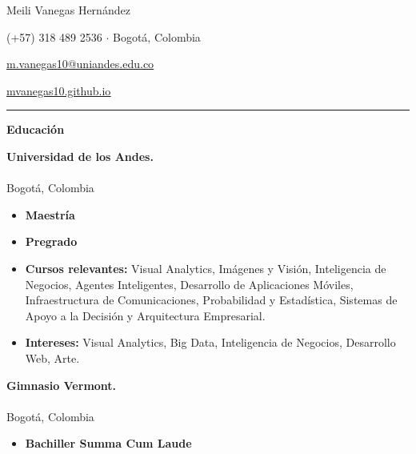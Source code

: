 \documentclass[10pt]{article}
\begin{document}
\begin{center}
\LARGE{Meili Vanegas Hernández} 

\normalsize{
 (+57) 318 489 2536 $\cdot$ Bogotá, Colombia
 
 \href{mailto:m.vanegas10@uniandes.edu.co}{\underline{m.vanegas10@uniandes.edu.co}}
 
\textcolor{blue}{\href{https://mvanegas10.github.io}{\underline{mvanegas10.github.io}}}
}
\end{center}
\hrule
\vspace{0.25cm}

\setcounter{secnumdepth}{0}
\setlength\parindent{0pt} 


{\large \textbf{Educación}}
{\footnotesize
\begin{multicols}{3}
{\bf Universidad de los Andes.} \\  \\ Bogotá, Colombia
\end{multicols}
 
\begin{itemize}
	 \item {\bf Maestría}     
	 
	 \item {\bf Pregrado}     
	
	\item \textbf{Cursos relevantes:} Visual Analytics, Imágenes y Visión, Inteligencia de Negocios, Agentes Inteligentes, Desarrollo de Aplicaciones Móviles, Infraestructura de Comunicaciones, Probabilidad y Estadística, Sistemas de Apoyo a la Decisión y Arquitectura Empresarial.  
		
	\item \textbf{Intereses:} Visual Analytics, Big Data, Inteligencia de Negocios, Desarrollo Web, Arte.
\end{itemize}}

\begin{multicols}{4}
{\bf Gimnasio Vermont.} \\  \\ Bogotá, Colombia
\end{multicols}
 
\begin{itemize}
	 \item {\bf Bachiller Summa Cum Laude}  
\end{itemize}
\end{document}

